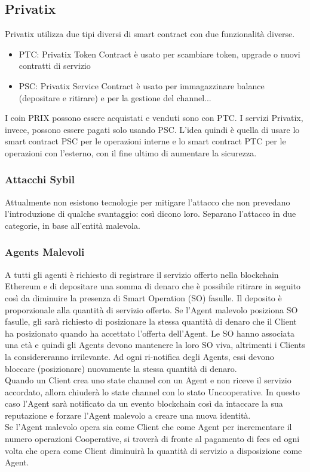 \documentclass[]{article}
\begin{document}
	
	
	\subsection{Privatix}	
	Privatix utilizza due tipi diversi di smart contract con due funzionalità diverse.	
	\begin{itemize}
	\item PTC: Privatix Token Contract è usato per scambiare token, upgrade o nuovi contratti di servizio
	\item PSC: Privatix Service Contract è usato per immagazzinare balance (depositare e ritirare) e per la gestione del channel...
	\end{itemize}	
	I coin PRIX possono essere acquistati e venduti sono con PTC. I servizi Privatix, invece, possono essere pagati solo usando PSC.
	L’idea quindi è quella di usare lo smart contract PSC per le operazioni interne e lo smart contract PTC per le operazioni con l’esterno, con il fine ultimo di aumentare la sicurezza.	
	\subsubsection{Attacchi Sybil}	
	Attualmente non esistono tecnologie per mitigare l’attacco che non prevedano l’introduzione di qualche svantaggio: così dicono loro.
	Separano l’attacco in due categorie, in base all’entità malevola.	
	\subsubsection{Agents Malevoli}	
	A tutti gli agenti è richiesto di registrare il servizio offerto nella blockchain Ethereum e di depositare una somma di denaro che è possibile ritirare in seguito così da diminuire la presenza di Smart Operation (SO) fasulle. Il deposito è proporzionale alla quantità di servizio offerto.
	Se l’Agent malevolo posiziona SO fasulle, gli sarà richiesto di posizionare la stessa quantità di denaro che il Client ha posizionato quando ha accettato l’offerta dell’Agent.
	Le SO hanno associata una età e quindi gli Agents devono mantenere la loro SO viva, altrimenti i Clients la considereranno irrilevante.
	Ad ogni ri-notifica degli Agents, essi devono bloccare (posizionare) nuovamente la stessa quantità di denaro.\\	
	Quando un Client crea uno state channel con un Agent e non riceve il servizio accordato, allora chiuderà lo state channel con lo stato Uncooperative. In questo caso l’Agent sarà notificato da un evento blockchain così da intaccare la sua reputazione e forzare l’Agent malevolo a creare una nuova identità.\\	
	Se l’Agent malevolo opera sia come Client che come Agent per incrementare il numero operazioni Cooperative, si troverà di fronte al pagamento di fees ed ogni volta che opera come Client diminuirà la quantità di servizio a disposizione come Agent.	
\end{document}
